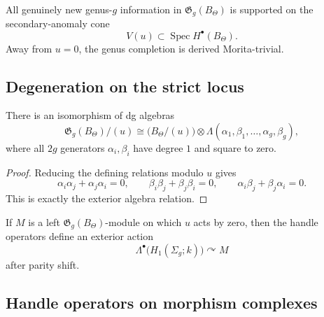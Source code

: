\begin{corollary}
All genuinely new genus-\(g\) information in \(\mathfrak{G}_{g}(B_{\Theta})\) is supported on the secondary-anomaly cone
\[
V(u)\subset \operatorname{Spec}H^{\bullet}(B_{\Theta}).
\]
Away from \(u=0\), the genus completion is derived Morita-trivial.
\end{corollary}

\subsection{Degeneration on the strict locus}

\begin{theorem}
There is an isomorphism of dg algebras
\[
\mathfrak{G}_{g}(B_{\Theta})/(u)
\cong
\big(B_{\Theta}/(u)\big)\otimes
\Lambda(\alpha_{1},\beta_{1},\dots,\alpha_{g},\beta_{g}),
\]
where all \(2g\) generators \(\alpha_{i},\beta_{i}\) have degree \(1\) and square to zero.
\end{theorem}

\begin{proof}
Reducing the defining relations modulo \(u\) gives
\[
\alpha_{i}\alpha_{j}+\alpha_{j}\alpha_{i}=0,\qquad
\beta_{i}\beta_{j}+\beta_{j}\beta_{i}=0,\qquad
\alpha_{i}\beta_{j}+\beta_{j}\alpha_{i}=0.
\]
This is exactly the exterior algebra relation.
\end{proof}

\begin{corollary}
If \(M\) is a left \(\mathfrak{G}_{g}(B_{\Theta})\)-module on which \(u\) acts by zero, then the handle operators define an exterior action
\[
\Lambda^{\bullet}\big(H_{1}(\Sigma_{g};k)\big)\curvearrowright M
\]
after parity shift.
\end{corollary}

\subsection{Handle operators on morphism complexes}

